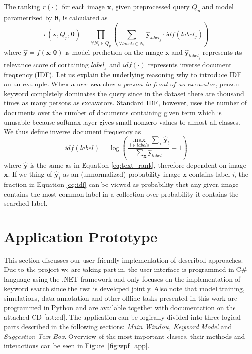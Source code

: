 The ranking $r(\cdot)$ for each image $\bm{x}$, given preprocessed query $Q_p$ and model parametrized by $\bm{\theta}$, is calculated as 
\begin{equation}
r\left(\bm{x}; Q_p, \bm{\theta}\right)=\prod\limits_{\forall N_i \in Q_p}\left(
	\sum\limits_{\forall label_j\in N_i} \bm{\hat{y}}_{label_j}\cdot idf\left(label_j\right)
\right)\label{eq:text_rank}
\end{equation}
where $\bm{\hat{y}}=f\left(\bm{x}; \bm{\theta}\right)$  is model prediction on the image $\bm{x}$ and $\bm{\hat{y}}_{label_j}$ represents its relevance score of containing $label_j$ and $idf(\cdot)$ represents inverse document frequency (IDF). Let us explain the underlying reasoning why to introduce IDF on an example: When a user searches \textit{a person in front of an excavator}, person keyword completely dominates the query since in the dataset there are thousand times as many persons as excavators. Standard IDF, however, uses the number of documents over the number of documents containing given term which is unusable because softmax layer gives small nonzero values to almost all classes. We thus define inverse document frequency as
\begin{equation}
idf(label) = \log\left(
\frac{
\max\limits_{i\in labels} \sum_{\bm{x}}\hat{\bm{y}}_{i}
}{
\sum_{\bm{x}}\hat{\bm{y}}_{label}
} + 1\right)\label{eq:idf}
\end{equation}
where $\hat{\bm{y}}$ is the same as in Equation \ref{eq:text_rank}, therefore dependent on image $\bm{x}$. If we thing of $\hat{\bm{y}}_i$ as an (unnormalized) probability image $\bm{x}$ contains label $i$, the fraction in Equation \ref{eq:idf} can be viewed as probability that any given image contains the most common label in a collection over probability it contains the searched label.

\section{Application Prototype}\label{chap:application_prototype}
This section discusses our user-friendly implementation of described approaches. Due to the project we are taking part in, the user interface is programmed in C\# language using the .NET framework and only focuses on the implementation of keyword search since the rest is developed jointly. Also note that model training, simulations, data annotation and other offline tasks presented in this work are programmed in Python and are available together with documentation on the attached CD \ref{att:cd}. The application can be logically divided into three logical parts described in the following sections: \textit{Main Window}, \textit{Keyword Model} and \textit{Suggestion Text Box}. Overview of the most important classes, their methods and interactions can be seen in Figure~\ref{fig:wpf_app}.

